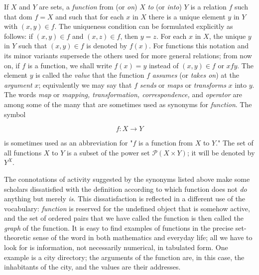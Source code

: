 
If $X$ and $Y$ are sets, a \textit{function} from (or \textit{on}) $X$ \textit{to} (or \textit{into}) $Y$ is a relation $f$ such that dom $f = X$ and such that for each $x$ in $X$ there is a unique element $y$ in $Y$ with $(x, y) \in f$. The uniqueness condition can be formulated explicitly as follows: if $(x, y) \in f$ and $(x, z) \in f$, then $y = z$. For each $x$ in $X$, the unique $y$ in $Y$ such that $(x, y) \in f$ is denoted by $f(x)$. For functions this notation and its minor variants supersede the others used for more general relations; from now on, if $f$ is a function, we shall write $f(x) = y$ instead of $(x, y) \in f$ or $x f y$. The element $y$ is called the \textit{value} that the function $f$ \textit{assumes} (or \textit{takes on}) at the \textit{argument} $x$; equivalently we may say that $f$ \textit{sends} or \textit{maps} or \textit{transforms} $x$ into $y$. The words \textit{map} or \textit{mapping, transformation, correspondence,} and \textit{operator} are among some of the many that are sometimes used as synonyms for \textit{function}. The symbol

\begin{equation*}
f: X \rightarrow Y
\end{equation*}

is sometimes used as an abbreviation for "$f$ is a function from $X$ to $Y$." The set of all functions $X$ to $Y$ is a subset of the power set $\mathcal{P}(X \times Y)$; it will be denoted by $Y^{X}$. 

The connotations of activity suggested by the synonyms listed above make some scholars dissatisfied with the definition according to which function does not \textit{do} anything but merely \textit{is}. This dissatisfaction is reflected in a different use of the vocabulary: \textit{function} is reserved for the undefined object that is somehow active, and the set of ordered pairs that we have called the function is then called the \textit{graph} of the function. It is easy to find examples of functions in the precise set-theoretic sense of the word in both mathematics and everyday life; all we have to look for is information, not necessarily numerical, in tabulated form. One example is a city directory; the arguments of the function are, in this case, the inhabitants of the city, and the values are their addresses. 

